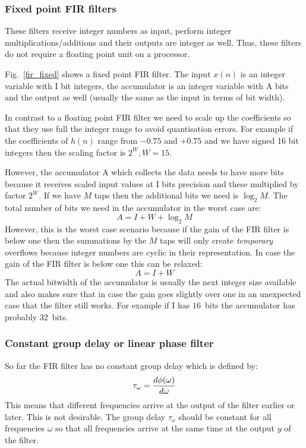 \documentclass[12pt,a4paper]{article}
\begin{document}
\subsubsection{Fixed point FIR filters}
These filters receive integer numbers as input, perform integer multiplications/additions
and their outputs are integer as well. Thus, these filters do not require
a floating point unit on a processor.

Fig.~\ref{fir_fixed} shows a fixed point FIR filter. The input $x(n)$ is an integer
variable with I bit integers, the accumulator is an integer variable with A bits and
the output as well (usually the same as the input in terms of bit width).

In contrast to a floating point FIR filter we need to scale up the
coefficients so that they use full the integer range to avoid
quantisation errors. For example if the coefficients of $h(n)$ range
from $-0.75$ and $+0.75$ and we have signed 16 bit integers then the
scaling factor is $2^W, W=15$.

However, the accumulator A which collects the data needs to have more
bits because it receives scaled input values at I bits precision and
these multiplied by factor $2^W$. If we have $M$ taps then the additional
bits we need is $\log_2 M$. The total number of bits we need in the accumulator
in the worst case are:
\begin{equation}
  A = I + W + \log_2 M
\end{equation}
However, this is the worst case scenario because if the gain of the
FIR filter is below one then the summations by the $M$ taps will only
create \textsl{temporary} overflows because integer numbers are
cyclic in their representation. In case the gain of the FIR filter
is below one this can be relaxed:
\begin{equation}
  A = I + W
\end{equation}
The actual bitwidth of the accumulator is usually the next integer size
available and also makes sure that in case the gain goes slightly over one
in an unexpected case that the filter still works. For example if I
has $16$~bits the accumulator has probably $32$~bits.


\subsubsection{Constant group delay or linear phase filter}
So far the FIR filter has
no constant group delay which is defined by:
\begin{equation}
\tau_\omega={d\phi(\omega)\over d\omega}
\label{grpdelay}
\end{equation}
This means that different frequencies arrive at the output of the
filter earlier or later. This is not desirable. The group delay
$\tau_\omega$ should be constant for all frequencies $\omega$ so that
all frequencies arrive at the same time at the output $y$ of the
filter.
\end{document}
